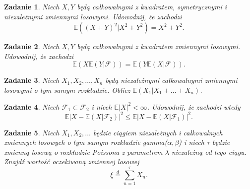 \documentclass[12pt]{mwart}
\newtheorem{zd}{Zadanie}
\begin{document}
\begin{zd}
Niech $X,Y$ będą całkowalnymi z kwadratem, symetrycznymi i niezależnymi zmiennymi losowymi.	Udowodnij, że zachodzi
\begin{displaymath}
\mathbb{E}\left((X+Y)^2|X^2+Y^2\right) = X^2 + Y^2.
\end{displaymath}
\end{zd}
\begin{zd}
Niech $X,Y$ będą całkowalnymi z kwadratem zmiennymi losowymi. Udowodnij, że zachodzi
\begin{displaymath}
\mathbb{E}\left(X\mathbb{E}(Y|\mathcal{F})\right) = \mathbb{E}\left(Y\mathbb{E}(X|\mathcal{F})\right).
\end{displaymath}
\end{zd}	
\begin{zd}
	Niech $X_1, X_2, \dots, X_n$ będą niezależnymi całkowalnymi zmiennymi losowymi o tym samym rozkładzie. Oblicz $\mathbb{E}(X_1| X_1+ \dots +X_n)$. 
\end{zd}
\begin{zd}
	Niech $\mathcal{F}_1 \subset \mathcal{F}_2$ i niech $\mathbb{E}|X|^2 <\infty$. Udowodnij, że zachodzi wtedy
	\begin{displaymath}
	\mathbb{E}\left|X - \mathbb{E}(X|\mathcal{F}_2)\right| ^2 \leq \mathbb{E}\left|X - \mathbb{E}(X|\mathcal{F}_1)\right| ^2.
	\end{displaymath}
\end{zd}
\begin{zd}
	Niech $X_1, X_2, \dots $ będzie ciągiem niezależnych i całkowalnych zmiennych losowych o tym samym rozkładzie gamma($\alpha,\beta$) i niech $\tau$ będzie zmienną losową o rozkładzie Poissona z parametrem $\lambda$ niezależną od tego ciągu. Znajdź wartość oczekiwaną zmiennej losowej
	\begin{displaymath}
	\xi \stackrel{d}{=} \sum_{n=1}^\tau X_n.
	\end{displaymath}
\end{zd}	
	
	
	
	
\end{document}
